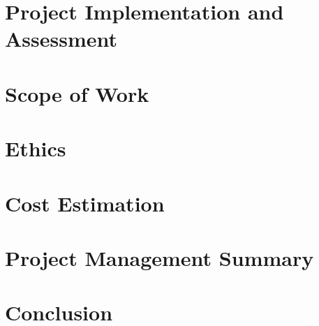 \documentclass[letterpaper,12pt]{article}
\begin{document}
\section{Project Implementation and Assessment}
\section{Scope of Work}
\section{Ethics}
\section{Cost Estimation}
\section{Project Management Summary}
\section{Conclusion}
\end{document}
